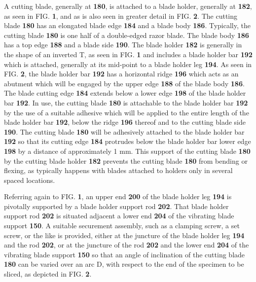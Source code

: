 \documentclass{article}
\begin{document}
A cutting blade, generally at \textbf{180}, is attached to a blade holder, generally at \textbf{182}, as seen in FIG. \textbf{1}, and as is also seen in greater detail in FIG. \textbf{2}. The cutting blade \textbf{180} has an elongated blade edge \textbf{184} and a blade body \textbf{186}. Typically, the cutting blade \textbf{180} is one half of a double-edged razor blade. The blade body \textbf{186} has a top edge \textbf{188} and a blade side \textbf{190}. The blade holder \textbf{182} is generally in the shape of an inverted T, as seen in FIG. \textbf{1} and includes a blade holder bar \textbf{192} which is attached, generally at its mid-point to a blade holder leg \textbf{194}. As seen in FIG. \textbf{2}, the blade holder bar \textbf{192} has a horizontal ridge \textbf{196} which acts as an abutment which will be engaged by the upper edge \textbf{188} of the blade body \textbf{186}. The blade cutting edge \textbf{184} extends below a lower edge \textbf{198} of the blade holder bar \textbf{192}. In use, the cutting blade \textbf{180} is attachable to the blade holder bar \textbf{192} by the use of a suitable adhesive which will be applied to the entire length of the blade holder bar \textbf{192}, below the ridge \textbf{196} thereof and to the cutting blade side \textbf{190}. The cutting blade \textbf{180} will be adhesively attached to the blade holder bar \textbf{192} so that its cutting edge \textbf{184} protrudes below the blade holder bar lower edge \textbf{198} by a distance of approximately 1 mm. This support of the cutting blade \textbf{180} by the cutting blade holder \textbf{182} prevents the cutting blade \textbf{180} from bending or flexing, as typically happens with blades attached to holders only in several spaced locations.

Referring again to FIG. \textbf{1}, an upper end \textbf{200} of the blade holder leg \textbf{194} is pivotally supported by a blade holder support rod \textbf{202}. That blade holder support rod \textbf{202} is situated adjacent a lower end \textbf{204} of the vibrating blade support \textbf{150}. A suitable securement assembly, such as a clamping screw, a set screw, or the like is provided, either at the juncture of the blade holder leg \textbf{194} and the rod \textbf{202}, or at the juncture of the rod \textbf{202} and the lower end \textbf{204} of the vibrating blade support \textbf{150} so that an angle of inclination of the cutting blade \textbf{180} can be varied over an arc D, with respect to the end of the specimen to be sliced, as depicted in FIG. \textbf{2}.
\end{document}
